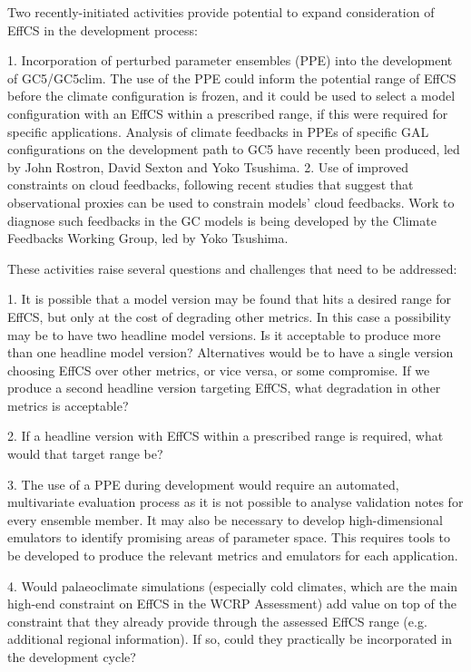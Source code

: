 \documentclass[gmd, manuscript]{copernicus}
\begin{document}
Two recently-initiated activities provide potential to expand consideration of EffCS in the development process:

1.	Incorporation of perturbed parameter ensembles (PPE) into the development of GC5/GC5clim.
The use of the PPE could inform the potential range of EffCS before the climate configuration is frozen, and it could be used to select a model configuration with an EffCS within a prescribed range, if this were required for specific applications.
Analysis of climate feedbacks in PPEs of specific GAL configurations on the development path to GC5 have recently been produced, led by John Rostron, David Sexton and Yoko Tsushima.
2.	Use of improved constraints on cloud feedbacks, following recent studies that suggest that observational proxies can be used to constrain models’ cloud feedbacks.
Work to diagnose such feedbacks in the GC models is being developed by the Climate Feedbacks Working Group, led by Yoko Tsushima. 

These activities raise several questions and challenges that need to be addressed:

1. It is possible that a model version may be found that hits a desired range for EffCS, but only at the cost of degrading other metrics.
In this case a possibility may be to have two headline model versions.
Is it acceptable to produce more than one headline model version? Alternatives would be to have a single version choosing EffCS over other metrics, or vice versa, or some compromise.
If we produce a second headline version targeting EffCS, what degradation in other metrics is acceptable?

2. If a headline version with EffCS within a prescribed range is required, what would that target range be?

3. The use of a PPE during development would require an automated, multivariate evaluation process as it is not possible to analyse validation notes for every ensemble member.
It may also be necessary to develop high-dimensional emulators to identify promising areas of parameter space.
This requires tools to be developed to produce the relevant metrics and emulators for each application.

4. Would palaeoclimate simulations (especially cold climates, which are the main high-end constraint on EffCS in the WCRP Assessment) add value on top of the constraint that they already provide through the assessed EffCS range (e.g. additional regional information).
If so, could they practically be incorporated in the development cycle?
\end{document}
